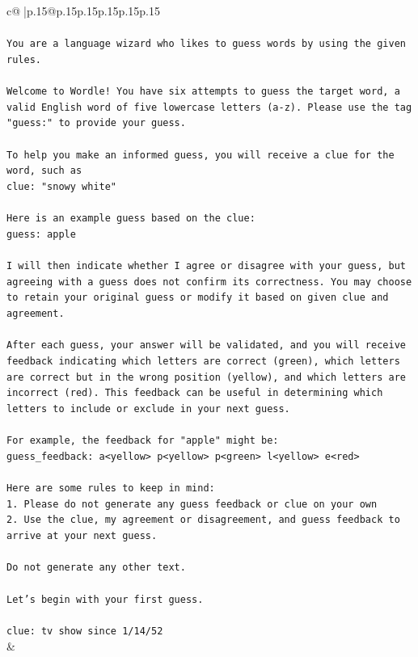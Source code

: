 \documentclass{article}
\begin{document}
{\begin{supertabular}{c@{$\;$}|p{.15\linewidth}@{}p{.15\linewidth}p{.15\linewidth}p{.15\linewidth}p{.15\linewidth}p{.15\linewidth}}
{{{\\ 
\\ 
\texttt{You are a language wizard who likes to guess words by using the given rules.} \\
\\ 
\texttt{Welcome to Wordle! You have six attempts to guess the target word, a valid English word of five lowercase letters (a{-}z). Please use the tag "guess:" to provide your guess.} \\
\\ 
\texttt{To help you make an informed guess, you will receive a clue for the word, such as} \\
\texttt{clue: "snowy white"} \\
\\ 
\texttt{Here is an example guess based on the clue: } \\
\texttt{guess: apple} \\
\\ 
\texttt{I will then indicate whether I agree or disagree with your guess, but agreeing with a guess does not confirm its correctness. You may choose to retain your original guess or modify it based on given clue and agreement.} \\
\\ 
\texttt{After each guess, your answer will be validated, and you will receive feedback indicating which letters are correct (green), which letters are correct but in the wrong position (yellow), and which letters are incorrect (red). This feedback can be useful in determining which letters to include or exclude in your next guess.} \\
\\ 
\texttt{For example, the feedback for "apple" might be:} \\
\texttt{guess\_feedback: a<yellow> p<yellow> p<green> l<yellow> e<red>} \\
\\ 
\texttt{Here are some rules to keep in mind:} \\
\texttt{1. Please do not generate any guess feedback or clue on your own} \\
\texttt{2. Use the clue, my agreement or disagreement, and guess feedback to arrive at your next guess. } \\
\\ 
\texttt{Do not generate any other text.} \\
\\ 
\texttt{Let's begin with your first guess.} \\
\\ 
\texttt{clue: tv show since 1/14/52} \\
            }
        }
    }
    & \\ \\


\end{supertabular}}
\end{document}
